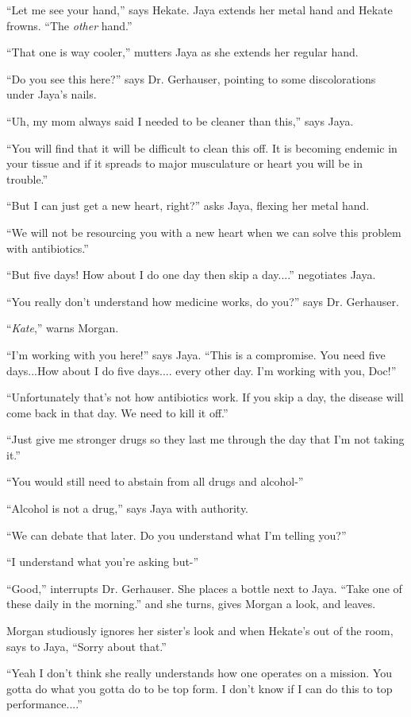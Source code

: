 ``Let me see your hand,'' says Hekate.  Jaya extends her metal hand and Hekate frowns.  ``The \textit{other} hand.''

``That one is way cooler,'' mutters Jaya as she extends her regular hand.

``Do you see this here?'' says Dr. Gerhauser, pointing to some discolorations under Jaya's nails.

``Uh, my mom always said I needed to be cleaner than this,'' says Jaya.

``You will find that it will be difficult to clean this off.  It is becoming endemic in your tissue and if it spreads to major musculature or heart you will be in trouble.''

``But I can just get a new heart, right?'' asks Jaya, flexing her metal hand.

``We will not be resourcing you with a new heart when we can solve this problem with antibiotics.''

``But five days!  How about I do one day then skip a day....'' negotiates Jaya.

``You really don't understand how medicine works, do you?'' says Dr. Gerhauser.

``\textit{Kate},'' warns Morgan.

``I'm working with you here!'' says Jaya.  ``This is a compromise.  You need five days...How about I do five days.... every other day.  I'm working with you, Doc!''

``Unfortunately that's not how antibiotics work.  If you skip a day, the disease will come back in that day.  We need to kill it off.''

``Just give me stronger drugs so they last me through the day that I'm not taking it.''

``You would still need to abstain from all drugs and alcohol-''

``Alcohol is not a drug,'' says Jaya with authority.

``We can debate that later.  Do you understand what I'm telling you?''

``I understand what you're asking but-''

``Good,'' interrupts Dr. Gerhauser.  She places a bottle next to Jaya.  ``Take one of these daily in the morning.''  and she turns, gives Morgan a look, and leaves.

Morgan studiously ignores her sister's look and when Hekate's out of the room, says to Jaya, ``Sorry about that.''

``Yeah I don't think she really understands how one operates on a mission.  You gotta do what you gotta do to be top form.  I don't know if I can do this to top performance....''

